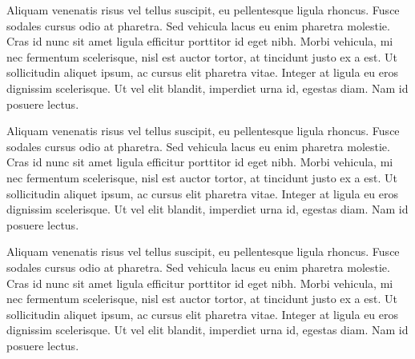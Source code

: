 Aliquam venenatis risus vel tellus suscipit, eu pellentesque ligula rhoncus. Fusce sodales cursus odio at pharetra. Sed vehicula lacus eu enim pharetra molestie. Cras id nunc sit amet ligula efficitur porttitor id eget nibh. Morbi vehicula, mi nec fermentum scelerisque, nisl est auctor tortor, at tincidunt justo ex a est. Ut sollicitudin aliquet ipsum, ac cursus elit pharetra vitae. Integer at ligula eu eros dignissim scelerisque. Ut vel elit blandit, imperdiet urna id, egestas diam. Nam id posuere lectus.

Aliquam venenatis risus vel tellus suscipit, eu pellentesque ligula rhoncus. Fusce sodales cursus odio at pharetra. Sed vehicula lacus eu enim pharetra molestie. Cras id nunc sit amet ligula efficitur porttitor id eget nibh. Morbi vehicula, mi nec fermentum scelerisque, nisl est auctor tortor, at tincidunt justo ex a est. Ut sollicitudin aliquet ipsum, ac cursus elit pharetra vitae. Integer at ligula eu eros dignissim scelerisque. Ut vel elit blandit, imperdiet urna id, egestas diam. Nam id posuere lectus.

Aliquam venenatis risus vel tellus suscipit, eu pellentesque ligula rhoncus. Fusce sodales cursus odio at pharetra. Sed vehicula lacus eu enim pharetra molestie. Cras id nunc sit amet ligula efficitur porttitor id eget nibh. Morbi vehicula, mi nec fermentum scelerisque, nisl est auctor tortor, at tincidunt justo ex a est. Ut sollicitudin aliquet ipsum, ac cursus elit pharetra vitae. Integer at ligula eu eros dignissim scelerisque. Ut vel elit blandit, imperdiet urna id, egestas diam. Nam id posuere lectus.

